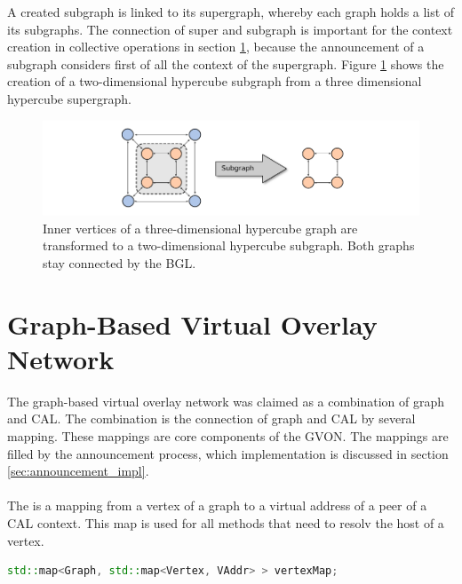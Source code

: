 A created subgraph is linked to its supergraph, whereby each graph
holds a list of its subgraphs. The connection of super and subgraph is
important for the context creation in collective operations in section
\ref{sec:gvon_impl}, because the announcement of a subgraph considers
first of all the context of the supergraph. Figure
\ref{fig:subgraph_creation} shows the creation of a two-dimensional
hypercube subgraph from a three dimensional hypercube supergraph.

\begin{figure}[H]
  \centering
  \includegraphics[width=\textwidth]{graphics/40_subgraph_creation}
  \caption{Inner vertices of a three-dimensional hypercube graph are 
  transformed to a two-dimensional hypercube subgraph. Both graphs
  stay connected by the BGL.}
  \label{fig:subgraph_creation}
\end{figure}

\section{Graph-Based Virtual Overlay Network}
\label{sec:gvon_impl}

The graph-based virtual overlay network was claimed as a combination
of graph and CAL. The combination is the connection of graph and CAL
by several mapping. These mappings are core components of the GVON.
The mappings are filled by the announcement process, which
implementation is discussed in section \ref{sec:announcement_impl}.

\paragraph*{}
The  is a mapping from a vertex of a graph to a virtual
address of a peer of a CAL context.  This map is used for all methods
that need to resolv the host of a vertex.
\begin{lstlisting}[language=C++, label=lst:mapping1]
std::map<Graph, std::map<Vertex, VAddr> > vertexMap;
\end{lstlisting}

